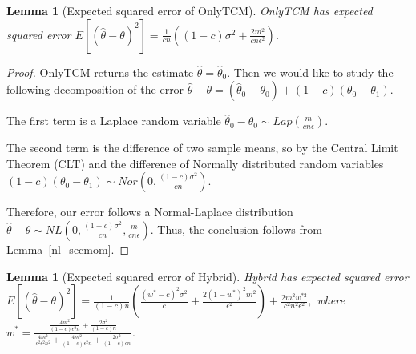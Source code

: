 \documentclass{article}
\theoremstyle{plain}
\newtheorem{lem}[thm]{Lemma}
\begin{document}
\begin{lem}[Expected squared error of OnlyTCM]
\label{MSE_OnlyTCM}
OnlyTCM has expected squared error
$E[(\hat{\theta} - \theta)^2] = \frac{1}{cn}\left((1-c)\sigma^2 + \frac{2m^2}{cn \epsilon^2 }\right).$
\end{lem}
\begin{proof}
OnlyTCM returns the estimate $\hat{\theta} = \hat{\theta}_0$. Then we would like to study the following decomposition of the error
$\hat{\theta} - \theta = (\hat{\theta}_0 - \theta_0) + (1-c)(\theta_0 - \theta_1).$

The first term is a Laplace random variable
$\hat{\theta}_0 - \theta_0 \sim Lap\left(\frac{m}{cn\epsilon}\right).$

The second term is the difference of two sample means, so by the Central Limit Theorem (CLT) and the difference of Normally distributed random variables
$(1-c)(\theta_0 - \theta_1) \sim Nor\left(0, \frac{(1-c)\sigma^2}{cn}\right).$

Therefore, our error follows a Normal-Laplace distribution
$\hat{\theta} - \theta \sim NL\left(0, \frac{(1-c)\sigma^2}{cn}, \frac{m}{cn\epsilon} \right).$
Thus, the conclusion follows from Lemma~\ref{nl_secmom}.
\end{proof}

\begin{lem}[Expected squared error of Hybrid]\label{lem:hybrid-error}
Hybrid has expected squared error 
$E[(\hat{\theta} - \theta)^2] = \frac{1}{(1-c)n}\left(\frac{(w^*-c)^2\sigma^2}{c} + \frac{2(1-w^*)^2 m^2}{\epsilon^2}\right) + \frac{2m^2w^{*2}}{c^2n^2\epsilon^2},$
where
$w^* = \frac{\frac{4 m^2}{(1-c) \epsilon^2 n}+\frac{2 \sigma^2}{(1-c) n}}{\frac{4 m^2}{c^2 \epsilon^2 n^2}+\frac{4 m^2}{(1-c) \epsilon^2 n}+\frac{2 \sigma^2}{(1-c) c n}}.$
\end{lem}
\end{document}
